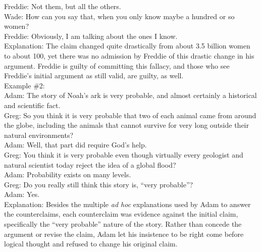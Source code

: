 \documentclass[a4paper,12pt,single,pdftex]{scrbook}
\begin{document}
    
      Freddie: Not them, but all the others.
    \\

    
      Wade: How can you say that, when you only know maybe a hundred or so women?
    \\

    
      Freddie: Obviously, I am talking about the ones I know.
    \\

    
      Explanation: The claim changed quite drastically from about 3.5 billion women to about 100, yet there was no admission by Freddie of this drastic change in his argument.  Freddie is guilty of committing this fallacy, and those who see Freddie’s initial argument as still valid, are guilty, as well.
    \\

    
      Example \#2:
    \\

    
      Adam: The story of Noah’s ark is very probable, and almost certainly a historical and scientific fact.
    \\

    
      Greg: So you think it is very probable that two of each animal came from around the globe, including the animals that cannot survive for very long outside their natural environments?
    \\

    
      Adam: Well, that part did require God’s help.
    \\

    
      Greg: You think it is very probable even though virtually every geologist and natural scientist today reject the idea of a global flood?
    \\

    
      Adam: Probability exists on many levels.
    \\

    
      Greg: Do you really still think this story is, “very probable”?
    \\

    
      Adam: Yes.
    \\

    
      Explanation: Besides the multiple {\it ad hoc}  explanations used by Adam to answer the counterclaims, each counterclaim was evidence against the initial claim, specifically the “very probable” nature of the story.  Rather than concede the argument or revise the claim, Adam let his insistence to be right come before logical thought and refused to change his original claim.
    \\
\end{document}
